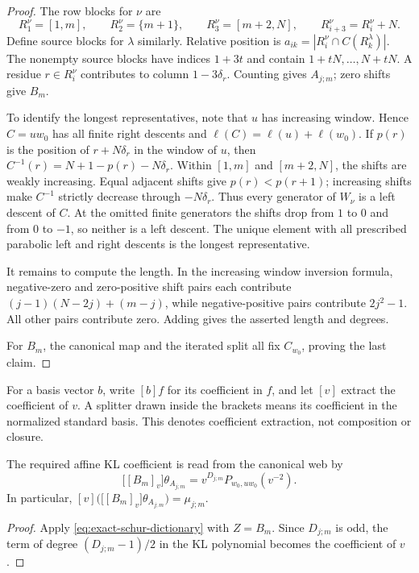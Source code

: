 \documentclass[a4paper,11pt]{amsart}
\numberwithin{equation}{subsection}
\theoremstyle{plain}
\theoremstyle{definition}
\theoremstyle{remark}
\begin{document}
\begin{proof}
The row blocks for $\nu$ are
\[
R_1^\nu=[1,m],\qquad R_2^\nu=\{m+1\},\qquad
R_3^\nu=[m+2,N],\qquad R_{i+3}^\nu=R_i^\nu+N.
\]
Define source blocks for $\lambda$ similarly. Relative
position is $a_{ik}=|R_i^\nu\cap C(R_k^\lambda)|$.
The nonempty source blocks have indices $1+3t$ and contain
$1+tN,\ldots,N+tN$. A residue $r\in R_i^\nu$ contributes
to column $1-3\delta_r$. Counting gives $A_{j;m}$;
zero shifts give $B_m$.

To identify the longest representatives, note that $u$ has
increasing window. Hence $C=uw_0$ has all finite right
descents and $\ell(C)=\ell(u)+\ell(w_0)$.
If $p(r)$ is the position of $r+N\delta_r$
in the window of $u$, then
$C^{-1}(r)=N+1-p(r)-N\delta_r.$
Within $[1,m]$ and $[m+2,N]$, the shifts are weakly
increasing. Equal adjacent shifts give $p(r)<p(r+1)$;
increasing shifts make $C^{-1}$ strictly decrease through
$-N\delta_r$. Thus every generator of $W_\nu$ is a left
descent of $C$. At the omitted finite generators the shifts
drop from $1$ to $0$ and from $0$ to $-1$, so neither is a
left descent. The unique element with all prescribed
parabolic left and right descents is the longest representative.

It remains to compute the length. In the increasing window
inversion formula, negative-zero and zero-positive shift
pairs each contribute $(j-1)(N-2j)+(m-j)$, while
negative-positive pairs contribute $2j^2-1$. All other pairs
contribute zero. Adding gives the asserted length and degrees.

For $B_m$, the canonical map and the
iterated split all fix $C_{w_0}$, proving the last claim.
\end{proof}

For a basis vector $b$, write $[b]f$ for its coefficient in
$f$, and let $[v]$ extract the coefficient of $v$.
A splitter drawn inside the brackets means its coefficient in
the normalized standard basis. This denotes coefficient extraction,
not composition or closure.

\begin{proposition}\label{cor:dictionary-readout}
The required affine KL coefficient is read from the canonical
web by
\[
\big[[B_m]_v\big]\theta_{A_{j;m}}
=v^{D_{j;m}}P_{w_0,uw_0}(v^{-2}).
\]
In particular,
$[v]\big(\big[[B_m]_v\big]\theta_{A_{j;m}}\big)=\mu_{j;m}.$
\end{proposition}

\begin{proof}
Apply \autoref{eq:exact-schur-dictionary} with $Z=B_m$.
Since $D_{j;m}$ is odd, the term of degree $(D_{j;m}-1)/2$
in the KL polynomial becomes the coefficient of $v$.
\end{proof}
\end{document}

